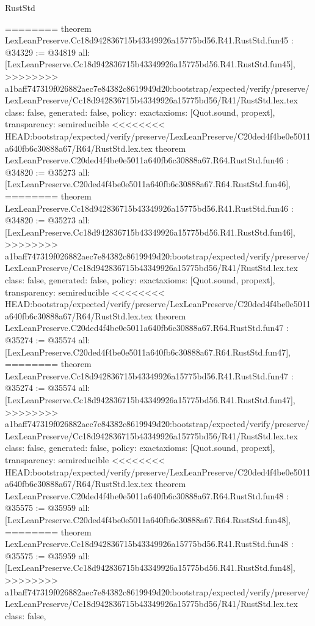 \begin{lexlean}{RustStd}
\begin{coremodule}
{\begin{coremodule}
{{{{{{{{{{{{{{{{{{{{{{{{{{{{{{{{{{{{{{{{{{{{{{{{========
theorem LexLeanPreserve.Cc18d942836715b43349926a15775bd56.R41.RustStd.fun45 : @34329 := @34819 {
  all: [LexLeanPreserve.Cc18d942836715b43349926a15775bd56.R41.RustStd.fun45],
>>>>>>>> a1baff747319f026882aec7e84382c8619949d20:bootstrap/expected/verify/preserve/LexLeanPreserve/Cc18d942836715b43349926a15775bd56/R41/RustStd.lex.tex
  class: false,
  generated: false,
  policy: exact{axioms: [Quot.sound, propext]},
  transparency: semireducible
}
<<<<<<<< HEAD:bootstrap/expected/verify/preserve/LexLeanPreserve/C20ded4f4be0e5011a640fb6c30888a67/R64/RustStd.lex.tex
theorem LexLeanPreserve.C20ded4f4be0e5011a640fb6c30888a67.R64.RustStd.fun46 : @34820 := @35273 {
  all: [LexLeanPreserve.C20ded4f4be0e5011a640fb6c30888a67.R64.RustStd.fun46],
========
theorem LexLeanPreserve.Cc18d942836715b43349926a15775bd56.R41.RustStd.fun46 : @34820 := @35273 {
  all: [LexLeanPreserve.Cc18d942836715b43349926a15775bd56.R41.RustStd.fun46],
>>>>>>>> a1baff747319f026882aec7e84382c8619949d20:bootstrap/expected/verify/preserve/LexLeanPreserve/Cc18d942836715b43349926a15775bd56/R41/RustStd.lex.tex
  class: false,
  generated: false,
  policy: exact{axioms: [Quot.sound, propext]},
  transparency: semireducible
}
<<<<<<<< HEAD:bootstrap/expected/verify/preserve/LexLeanPreserve/C20ded4f4be0e5011a640fb6c30888a67/R64/RustStd.lex.tex
theorem LexLeanPreserve.C20ded4f4be0e5011a640fb6c30888a67.R64.RustStd.fun47 : @35274 := @35574 {
  all: [LexLeanPreserve.C20ded4f4be0e5011a640fb6c30888a67.R64.RustStd.fun47],
========
theorem LexLeanPreserve.Cc18d942836715b43349926a15775bd56.R41.RustStd.fun47 : @35274 := @35574 {
  all: [LexLeanPreserve.Cc18d942836715b43349926a15775bd56.R41.RustStd.fun47],
>>>>>>>> a1baff747319f026882aec7e84382c8619949d20:bootstrap/expected/verify/preserve/LexLeanPreserve/Cc18d942836715b43349926a15775bd56/R41/RustStd.lex.tex
  class: false,
  generated: false,
  policy: exact{axioms: [Quot.sound, propext]},
  transparency: semireducible
}
<<<<<<<< HEAD:bootstrap/expected/verify/preserve/LexLeanPreserve/C20ded4f4be0e5011a640fb6c30888a67/R64/RustStd.lex.tex
theorem LexLeanPreserve.C20ded4f4be0e5011a640fb6c30888a67.R64.RustStd.fun48 : @35575 := @35959 {
  all: [LexLeanPreserve.C20ded4f4be0e5011a640fb6c30888a67.R64.RustStd.fun48],
========
theorem LexLeanPreserve.Cc18d942836715b43349926a15775bd56.R41.RustStd.fun48 : @35575 := @35959 {
  all: [LexLeanPreserve.Cc18d942836715b43349926a15775bd56.R41.RustStd.fun48],
>>>>>>>> a1baff747319f026882aec7e84382c8619949d20:bootstrap/expected/verify/preserve/LexLeanPreserve/Cc18d942836715b43349926a15775bd56/R41/RustStd.lex.tex
  class: false,
}}}}}}}}}}}}}}}}}}}}}}}}}}}}}}}}}}}}}}}}}}}}}}}}}}}}
\end{coremodule}}
\end{coremodule}
\end{lexlean}
